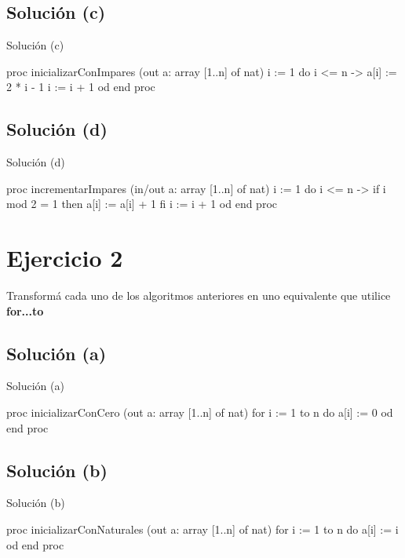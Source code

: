 \subsection{Solución (c)}
\begin{codebox}{Solución (c)}
\begin{pascallike}
proc inicializarConImpares (out a: array [1..n] of nat)
    i := 1
    do i <= n -> 
    a[i] := 2 * i - 1
    i := i + 1
    od
end proc
\end{pascallike}
\end{codebox}

\subsection{Solución (d)}
\begin{codebox}{Solución (d)}
\begin{pascallike}
proc incrementarImpares (in/out a: array [1..n] of nat)
    i := 1
    do i <= n -> 
    if i mod 2 = 1 then
        a[i] := a[i] + 1
    fi
    i := i + 1
    od
end proc
\end{pascallike}
\end{codebox}

\section{Ejercicio 2}
Transformá cada uno de los algoritmos anteriores en uno equivalente que utilice \textbf{for...to} 

\subsection{Solución (a)}
\begin{codebox}{Solución (a)}
\begin{pascallike}
proc inicializarConCero (out a: array [1..n] of nat)
    for i := 1 to n do
    a[i] := 0
    od
end proc
\end{pascallike}
\end{codebox}

\subsection{Solución (b)}
\begin{codebox}{Solución (b)}
\begin{pascallike}
proc inicializarConNaturales (out a: array [1..n] of nat)
    for i := 1 to n do
    a[i] := i
    od
end proc
\end{pascallike}
\end{codebox}

